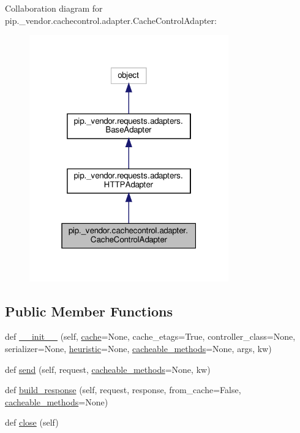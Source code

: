 Collaboration diagram for pip.\+\_\+vendor.\+cachecontrol.\+adapter.\+Cache\+Control\+Adapter\+:
\nopagebreak
\begin{figure}[H]
\begin{center}
\leavevmode
\includegraphics[width=244pt]{classpip_1_1__vendor_1_1cachecontrol_1_1adapter_1_1CacheControlAdapter__coll__graph}
\end{center}
\end{figure}
\subsection*{Public Member Functions}
\begin{DoxyCompactItemize}
\item 
def \hyperlink{classpip_1_1__vendor_1_1cachecontrol_1_1adapter_1_1CacheControlAdapter_a9e36b99d94a91c93c9f76fac3caf5c24}{\+\_\+\+\_\+init\+\_\+\+\_\+} (self, \hyperlink{classpip_1_1__vendor_1_1cachecontrol_1_1adapter_1_1CacheControlAdapter_a2a60f2cbb159cd1732706a2cc3f77321}{cache}=None, cache\+\_\+etags=True, controller\+\_\+class=None, serializer=None, \hyperlink{classpip_1_1__vendor_1_1cachecontrol_1_1adapter_1_1CacheControlAdapter_a8c7dd66b2ca89aa20daf58f9058a3937}{heuristic}=None, \hyperlink{classpip_1_1__vendor_1_1cachecontrol_1_1adapter_1_1CacheControlAdapter_a81865f403ea38521e80ef5122eaed1d0}{cacheable\+\_\+methods}=None, args, kw)
\item 
def \hyperlink{classpip_1_1__vendor_1_1cachecontrol_1_1adapter_1_1CacheControlAdapter_a64bbfb6ed83f4b755d9566ff45e0fae5}{send} (self, request, \hyperlink{classpip_1_1__vendor_1_1cachecontrol_1_1adapter_1_1CacheControlAdapter_a81865f403ea38521e80ef5122eaed1d0}{cacheable\+\_\+methods}=None, kw)
\item 
def \hyperlink{classpip_1_1__vendor_1_1cachecontrol_1_1adapter_1_1CacheControlAdapter_a3989016f8c12cf716f18d8436eeb5416}{build\+\_\+response} (self, request, response, from\+\_\+cache=False, \hyperlink{classpip_1_1__vendor_1_1cachecontrol_1_1adapter_1_1CacheControlAdapter_a81865f403ea38521e80ef5122eaed1d0}{cacheable\+\_\+methods}=None)
\item 
def \hyperlink{classpip_1_1__vendor_1_1cachecontrol_1_1adapter_1_1CacheControlAdapter_a4a0c2c447b066fbb5ac2c0e79c2d3b0d}{close} (self)
\end{DoxyCompactItemize}
